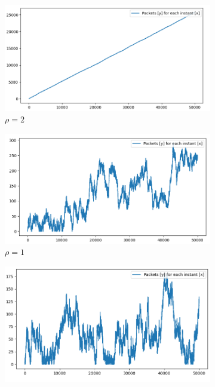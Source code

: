 \documentclass[10pt,a4paper]{article}
\begin{document}
\begin{figure}[h]
  \begin{subfigure}[t]{.45\textwidth}
    \centering
    \includegraphics[width=\linewidth]{img/pho2}
    \caption{\(\rho = 2\)}
    \label{fig:rho2}
  \end{subfigure}
  \hfill
  \begin{subfigure}[t]{.45\textwidth}
    \centering
	\includegraphics[width=\linewidth]{img/rho1}
    \caption{\(\rho = 1\)}
	\label{fig:rho1}
  \end{subfigure}
  \medskip
  \begin{subfigure}[t]{.45\textwidth}
    \centering
	\includegraphics[width=\linewidth]{img/rho0.99}

\end{subfigure}
\end{figure}
\end{document}
